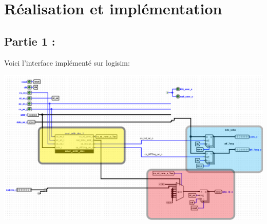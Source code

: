 \section{Réalisation et implémentation}

\subsection*{Partie 1 :}
\par
Voici l'interface implémenté sur logisim:\\
\begin{center}
\includegraphics[scale=0.4]{./images/Full_partie1.png}\\\par
{}
\end{center}

